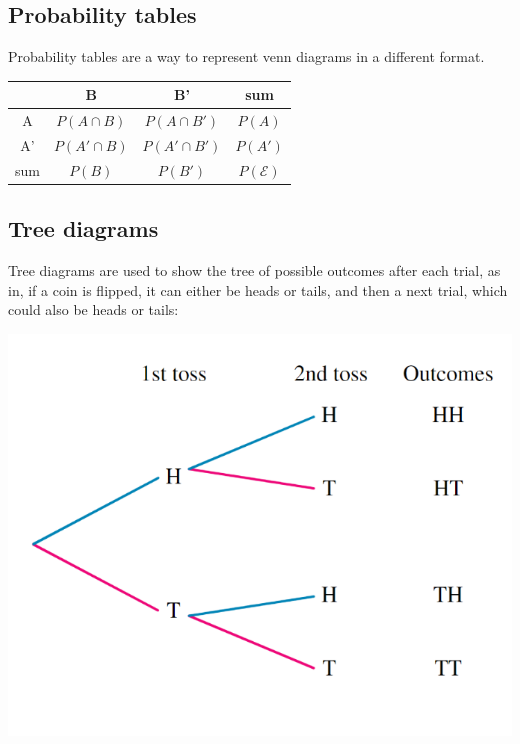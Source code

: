 \documentclass{report}
\begin{document}
\subsection{Probability tables}
Probability tables are a way to represent venn diagrams in a different format.
\begin{center}
	\begin{tabular}{c|c|c|c}
		    & B              & B'              & sum              \\ \hline
		A   & $P(A \cap B)$  & $P(A \cap B')$  & $P(A)$           \\ \hline
		A'  & $P(A' \cap B)$ & $P(A' \cap B')$ & $P(A')$          \\ \hline
		sum & $P(B)$         & $P(B')$         & $P(\mathcal{E})$
	\end{tabular}
\end{center}

\subsection{Tree diagrams}
Tree diagrams are used to show the tree of possible outcomes after each trial, as in, if a coin is flipped, it can either be heads or tails, and then a next trial, which could also be heads or tails:
\begin{center}
	\includegraphics[scale=0.5]{tree diagrams}
\end{center}
\end{document}
